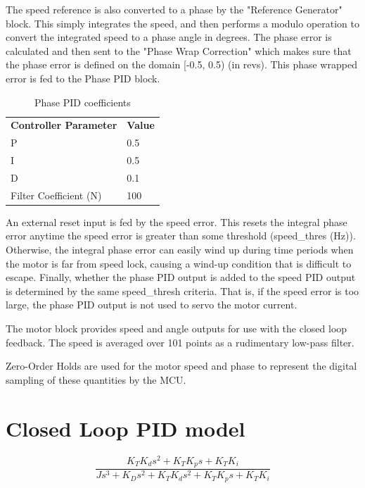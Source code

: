 \documentclass[11pt]{article} %
\begin{document}
The speed reference is also converted to a phase by the "Reference Generator" block. This simply integrates the speed, and then performs a modulo operation to convert the integrated speed to a phase angle in degrees. The phase error is calculated and then sent to the "Phase Wrap Correction" which makes sure that the phase error is defined on the domain [-0.5, 0.5) (in revs). This phase wrapped error is fed to the Phase PID block.

\begin{table}[h]
\centering
\begin{tabular}{l | l }
\textbf{Controller Parameter} & \textbf{Value} \\
P & 0.5 \\
I & 0.5 \\
D & 0.1 \\
Filter Coefficient (N) & 100
\end{tabular}
\caption{Phase PID coefficients}
\label{tab:PhasePIDcoeffs}
\end{table}

\noindent An external reset input is fed by the speed error. This resets the integral phase error anytime the speed error is greater than some threshold (speed\_thres (Hz)). Otherwise, the integral phase error can easily wind up during time periods when the motor is far from speed lock, causing a wind-up condition that is difficult to escape. Finally, whether the phase PID output is added to the speed PID output is determined by the same speed\_thresh criteria. That is, if the speed error is too large, the phase PID output is not used to servo the motor current.

The motor block provides speed and angle outputs for use with the closed loop feedback. The speed is averaged over 101 points as a rudimentary low-pass filter.

Zero-Order Holds are used for the motor speed and phase to represent the digital sampling of these quantities by the MCU.

\section{Closed Loop PID model}
\begin{equation}
\frac{K_T K_d s^2 + K_T K_p s + K_T K_i } {J s^3 + K_D s^2 + K_T K_d s^2 + K_T K_p s + K_T K_i}
\end{equation}
\end{document}
